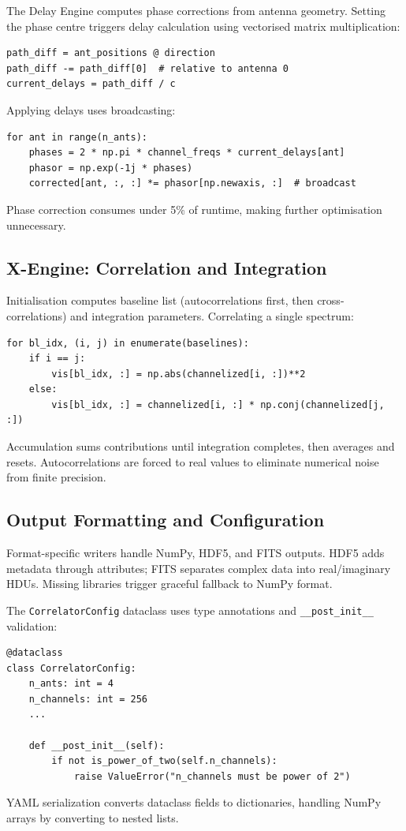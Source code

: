 The Delay Engine computes phase corrections from antenna geometry. Setting the phase centre triggers delay calculation using vectorised matrix multiplication:

\begin{verbatim}
path_diff = ant_positions @ direction
path_diff -= path_diff[0]  # relative to antenna 0
current_delays = path_diff / c
\end{verbatim}

Applying delays uses broadcasting:

\begin{verbatim}
for ant in range(n_ants):
    phases = 2 * np.pi * channel_freqs * current_delays[ant]
    phasor = np.exp(-1j * phases)
    corrected[ant, :, :] *= phasor[np.newaxis, :]  # broadcast
\end{verbatim}

Phase correction consumes under 5\% of runtime, making further optimisation unnecessary.

\subsection{X-Engine: Correlation and Integration}

Initialisation computes baseline list (autocorrelations first, then cross-correlations) and integration parameters. Correlating a single spectrum:

\begin{verbatim}
for bl_idx, (i, j) in enumerate(baselines):
    if i == j:
        vis[bl_idx, :] = np.abs(channelized[i, :])**2
    else:
        vis[bl_idx, :] = channelized[i, :] * np.conj(channelized[j, :])
\end{verbatim}

Accumulation sums contributions until integration completes, then averages and resets. Autocorrelations are forced to real values to eliminate numerical noise from finite precision.

\subsection{Output Formatting and Configuration}

Format-specific writers handle NumPy, HDF5, and FITS outputs. HDF5 adds metadata through attributes; FITS separates complex data into real/imaginary HDUs. Missing libraries trigger graceful fallback to NumPy format.

The \texttt{CorrelatorConfig} dataclass uses type annotations and \texttt{\_\_post\_init\_\_} validation:

\begin{verbatim}
@dataclass
class CorrelatorConfig:
    n_ants: int = 4
    n_channels: int = 256
    ...
    
    def __post_init__(self):
        if not is_power_of_two(self.n_channels):
            raise ValueError("n_channels must be power of 2")
\end{verbatim}

YAML serialization converts dataclass fields to dictionaries, handling NumPy arrays by converting to nested lists.
